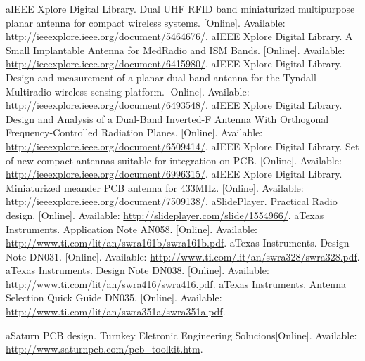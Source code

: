 \begin{thebibliography}{1}
	
	\bibitem aIEEE Xplore Digital Library. Dual UHF RFID band miniaturized multipurpose planar antenna for compact wireless systems. [Online]. Available: \href{http://ieeexplore.ieee.org/document/5464676/}{http://ieeexplore.ieee.org/document/5464676/}.
	\label{paperantena1}
	\bibitem aIEEE Xplore Digital Library. A Small Implantable Antenna for MedRadio and ISM Bands. [Online]. Available: \href{http://ieeexplore.ieee.org/document/6415980/}{http://ieeexplore.ieee.org/document/6415980/}.
	\bibitem aIEEE Xplore Digital Library. Design and measurement of a planar dual-band antenna for the Tyndall Multiradio wireless sensing platform. [Online]. Available: \href{http://ieeexplore.ieee.org/document/6493548/}{http://ieeexplore.ieee.org/document/6493548/}.
	\bibitem aIEEE Xplore Digital Library. Design and Analysis of a Dual-Band Inverted-F Antenna With Orthogonal Frequency-Controlled Radiation Planes. [Online]. Available: \href{http://ieeexplore.ieee.org/document/6509414/}{http://ieeexplore.ieee.org/document/6509414/}.
	\bibitem aIEEE Xplore Digital Library. Set of new compact antennas suitable for integration on PCB. [Online]. Available: \href{http://ieeexplore.ieee.org/document/6996315/}{http://ieeexplore.ieee.org/document/6996315/}.
	\bibitem aIEEE Xplore Digital Library. Miniaturized meander PCB antenna for 433MHz. [Online]. Available: \href{http://ieeexplore.ieee.org/document/7509138/}{http://ieeexplore.ieee.org/document/7509138/}.
	\bibitem aSlidePlayer. Practical Radio design. [Online]. Available: \href{http://slideplayer.com/slide/1554966/}{http://slideplayer.com/slide/1554966/}.
	\bibitem aTexas Instruments. Application Note AN058. [Online]. Available: \href{http://www.ti.com/lit/an/swra161b/swra161b.pdf}{http://www.ti.com/lit/an/swra161b/swra161b.pdf}.
	\bibitem aTexas Instruments. Design Note DN031. [Online]. Available: \href{http://www.ti.com/lit/an/swra328/swra328.pdf}{http://www.ti.com/lit/an/swra328/swra328.pdf}.
	\bibitem aTexas Instruments. Design Note DN038. [Online]. Available: \href{http://www.ti.com/lit/an/swra416/swra416.pdf}{http://www.ti.com/lit/an/swra416/swra416.pdf}.
	\bibitem aTexas Instruments. Antenna Selection Quick Guide DN035. [Online]. Available: \href{http://www.ti.com/lit/an/swra351a/swra351a.pdf}{http://www.ti.com/lit/an/swra351a/swra351a.pdf}.
	\label{appnoteantena2}
	
	
	
	
	\bibitem aSaturn PCB design. Turnkey Eletronic Engineering Solucions[Online]. Available: \href{http://www.saturnpcb.com/pcb_toolkit.htm}{http://www.saturnpcb.com/pcb\_toolkit.htm}.
	\label{saturn}
\end{thebibliography}\vfill\pagebreak\thispagestyle{plain}